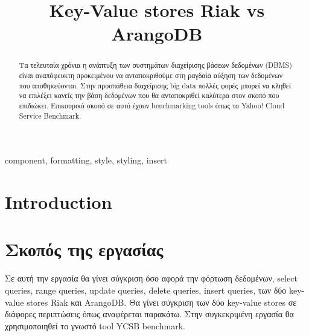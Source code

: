 \documentclass[conference]{IEEEtran}
\begin{document}
\title{Key-Value stores Riak vs ArangoDB \\

}

\author{
\and
{}
\and
{}
}

\maketitle

\begin{abstract}
    Τα τελευταία χρόνια η ανάπτυξη των συστημάτων 
διαχείρισης βάσεων δεδομένων (DBMS) είναι αναπόφευκτη προκειμένου να 
ανταποκριθούμε στη ραγδαία αύξηση των δεδομένων που 
αποθηκεύονται. Στην προσπάθεια διαχείρισης big data 
πολλές φορές μπορεί να κληθεί να επιλέξει κανείς την 
βάση δεδομένων που θα ανταποκριθεί καλύτερα στον σκοπό 
που επιδιώκει. Επικουρικό σκοπό σε αυτό έχουν benchmarking 
tools όπως το Yahoo! Cloud Service Benchmark.

\end{abstract}

\begin{IEEEkeywords}
component, formatting, style, styling, insert
\end{IEEEkeywords}

\section{Introduction}

\section{Σκοπός της εργασίας}

Σε αυτή την εργασία θα γίνει σύγκριση όσο αφορά την φόρτωση δεδομένων, select queries, range queries,
update queries, delete queries, insert queries, των δύο key-value stores Riak και ArangoDB. Θα γίνει
σύγκριση των δύο key-value stores σε διάφορες περιπτώσεις όπως αναφέρεται παρακάτω. Στην συγκεκριμένη εργασία θα
χρησιμοποιηθεί το γνωστό tool YCSB benchmark.
\end{document}
